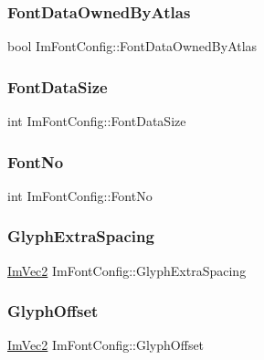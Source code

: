 \subsubsection{\texorpdfstring{Font\+Data\+Owned\+By\+Atlas}{FontDataOwnedByAtlas}}
{\footnotesize\ttfamily bool Im\+Font\+Config\+::\+Font\+Data\+Owned\+By\+Atlas}

\hypertarget{struct_im_font_config_a39df7ad3bb496421ce2cc5d2428345ef}{}\label{struct_im_font_config_a39df7ad3bb496421ce2cc5d2428345ef} 
\subsubsection{\texorpdfstring{Font\+Data\+Size}{FontDataSize}}
{\footnotesize\ttfamily int Im\+Font\+Config\+::\+Font\+Data\+Size}

\hypertarget{struct_im_font_config_ab37ee3d5cf76000a4000e9296161e527}{}\label{struct_im_font_config_ab37ee3d5cf76000a4000e9296161e527} 
\subsubsection{\texorpdfstring{Font\+No}{FontNo}}
{\footnotesize\ttfamily int Im\+Font\+Config\+::\+Font\+No}

\hypertarget{struct_im_font_config_a82db103689b1c434ec92875721967c07}{}\label{struct_im_font_config_a82db103689b1c434ec92875721967c07} 
\subsubsection{\texorpdfstring{Glyph\+Extra\+Spacing}{GlyphExtraSpacing}}
{\footnotesize\ttfamily \hyperlink{struct_im_vec2}{Im\+Vec2} Im\+Font\+Config\+::\+Glyph\+Extra\+Spacing}

\hypertarget{struct_im_font_config_a290a81956fdcb7ad3b5e3152594db121}{}\label{struct_im_font_config_a290a81956fdcb7ad3b5e3152594db121} 
\subsubsection{\texorpdfstring{Glyph\+Offset}{GlyphOffset}}
{\footnotesize\ttfamily \hyperlink{struct_im_vec2}{Im\+Vec2} Im\+Font\+Config\+::\+Glyph\+Offset}

